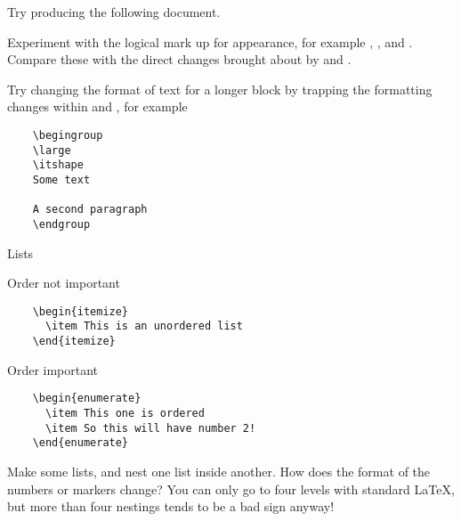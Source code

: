 \begin{exercise}
  Try producing the following document.
  

  Experiment with the logical mark up for appearance, for example , ,  and . Compare these with the direct changes brought about by  and .

  Try changing the format of text for a longer block by trapping the formatting changes within  and , for example
  \begin{verbatim}
	\begingroup
	\large
	\itshape
	Some text

	A second paragraph
	\endgroup
  \end{verbatim}

\end{exercise}

\begin{frame}{Lists}

\begin{block}{Order not important}
  \begin{verbatim}
	\begin{itemize}
	  \item This is an unordered list
	\end{itemize}
  \end{verbatim}
\end{block}

\begin{block}{Order important}
  \begin{verbatim}
	\begin{enumerate}
	  \item This one is ordered
	  \item So this will have number 2!
	\end{enumerate}
  \end{verbatim}
\end{block}

\end{frame}

\begin{exercise}
  Make some lists, and nest one list inside another.
  How does the format of the numbers or markers change?
  You can only go to four levels with standard \LaTeX{}, but more than four nestings tends to be a bad sign anyway!
\end{exercise}


